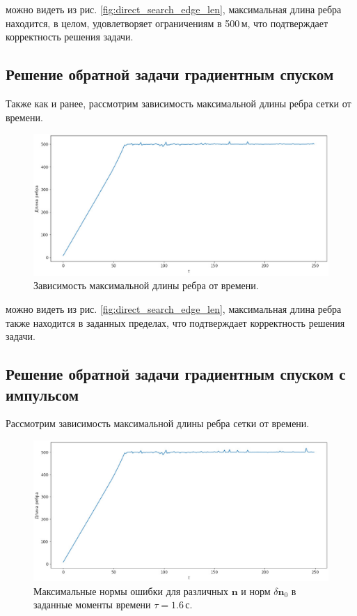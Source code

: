 \documentclass[12pt, cleqn, a4paper]{article}
\newcommand{\bfv}[1]{\mathbf{#1}}
\newcommand{\dn}{\delta \bfv{n}}
\begin{document}
 можно видеть из рис. \ref{fig:direct_search_edge_len}, максимальная длина ребра находится, в целом, удовлетворяет ограничениям в 500\,м, что подтверждает корректность решения задачи.


\subsection{Решение обратной задачи градиентным спуском}
Также как и ранее, рассмотрим зависимость максимальной длины ребра сетки от времени.
\begin{figure}[H] 
\centering
\includegraphics[width=1.0\linewidth]{grad_step_edge_len.eps}
\caption{Зависимость максимальной длины ребра от времени.}
\label{fig:grad_step_edge_len}
\end{figure}

 можно видеть из рис. \ref{fig:direct_search_edge_len}, максимальная длина ребра также находится в заданных пределах, что подтверждает корректность решения задачи.

\subsection{Решение обратной задачи градиентным спуском с импульсом}
Рассмотрим зависимость максимальной длины ребра сетки от времени.
\begin{figure}[H] 
\centering
\includegraphics[width=1.0\linewidth]{grad_impulse_edge_len.eps}
\caption{Максимальные нормы ошибки для различных $\bfv{n}$ и норм $\dn_0$ в заданные моменты времени $\tau = 1.6$\,с.}
\label{fig:grad_impulse_edge_len}
\end{figure}
\end{document}
